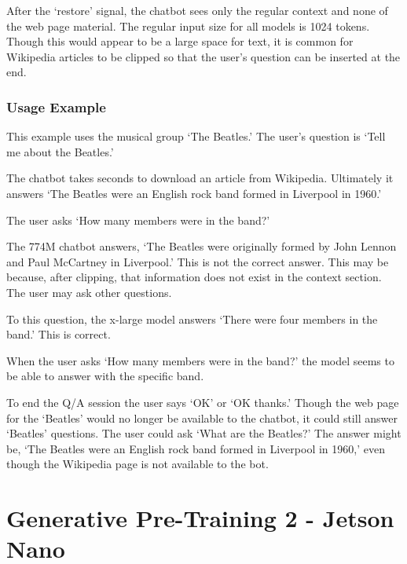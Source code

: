 
After the `restore' signal, the chatbot sees only the regular context and none of the web page material. The regular input size for all models is 1024 tokens. %
Though this would appear to be a large space for text, it is common for Wikipedia articles to be clipped so that the user's question can be inserted at the end.

\subsubsection{Usage Example}

This example uses the musical group `The Beatles.' The user's question is `Tell me about the Beatles.'

The chatbot takes seconds to download an article from Wikipedia. Ultimately it answers `The Beatles were an English rock band formed in Liverpool in 1960.'

The user asks `How many members were in the band?'

The 774M chatbot answers, `The Beatles were originally formed by John Lennon and Paul McCartney in Liverpool.' This is not the correct answer. This may be because, after clipping, that information does not exist in the context section. The user may ask other questions. %

To this question, the x-large model answers `There were four members in the band.' This is correct.

When the user asks `How many members were in the band?' the model seems to be able to answer with the specific band. %

To end the Q/A session the user says `OK' or `OK thanks.' Though the web page for the `Beatles' would no longer be available to the chatbot, it could still answer `Beatles'  questions. The user could ask `What are the Beatles?' The answer might be, `The Beatles were an English rock band formed in Liverpool in 1960,' even though the Wikipedia page is not available to the bot.

\label{chapter-xlarge}

\section{Generative Pre-Training 2 - Jetson Nano}


